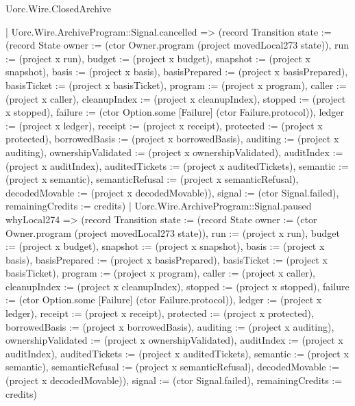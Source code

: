 \begin{lexlean}{Uorc.Wire.ClosedArchive}
\begin{semanticmodule}
{          | Uorc.Wire.ArchiveProgram::Signal.cancelled => (record Transition {state := (record State {owner := (ctor Owner.program (project movedLocal273 state)), run := (project x run), budget := (project x budget), snapshot := (project x snapshot), basis := (project x basis), basisPrepared := (project x basisPrepared), basisTicket := (project x basisTicket), program := (project x program), caller := (project x caller), cleanupIndex := (project x cleanupIndex), stopped := (project x stopped), failure := (ctor Option.some [Failure] (ctor Failure.protocol)), ledger := (project x ledger), receipt := (project x receipt), protected := (project x protected), borrowedBasis := (project x borrowedBasis), auditing := (project x auditing), ownershipValidated := (project x ownershipValidated), auditIndex := (project x auditIndex), auditedTickets := (project x auditedTickets), semantic := (project x semantic), semanticRefusal := (project x semanticRefusal), decodedMovable := (project x decodedMovable)}), signal := (ctor Signal.failed), remainingCredits := credits})
          | Uorc.Wire.ArchiveProgram::Signal.paused whyLocal274 => (record Transition {state := (record State {owner := (ctor Owner.program (project movedLocal273 state)), run := (project x run), budget := (project x budget), snapshot := (project x snapshot), basis := (project x basis), basisPrepared := (project x basisPrepared), basisTicket := (project x basisTicket), program := (project x program), caller := (project x caller), cleanupIndex := (project x cleanupIndex), stopped := (project x stopped), failure := (ctor Option.some [Failure] (ctor Failure.protocol)), ledger := (project x ledger), receipt := (project x receipt), protected := (project x protected), borrowedBasis := (project x borrowedBasis), auditing := (project x auditing), ownershipValidated := (project x ownershipValidated), auditIndex := (project x auditIndex), auditedTickets := (project x auditedTickets), semantic := (project x semantic), semanticRefusal := (project x semanticRefusal), decodedMovable := (project x decodedMovable)}), signal := (ctor Signal.failed), remainingCredits := credits})
}
\end{semanticmodule}
\end{lexlean}
